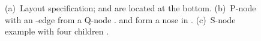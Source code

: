 \documentclass[a4paper,twoside,11pt]{article}
\begin{document}
\begin{figure}[t]
    \centering
    \begin{minipage}[b]{.24\textwidth}
        \centering
    \end{minipage}
    \begin{minipage}[b]{.24\textwidth}
        \centering
    \end{minipage}
    \begin{minipage}[b]{.45\textwidth}
        \centering
    \end{minipage}
    \caption{
    (a)~Layout specification;  and  are located at the bottom.
    (b)~P-node with an -edge from a Q-node .  and  form a nose in .
    (c)~S-node example with four children .}
    \label{fig:5p_bicon}
\end{figure}
\end{document}
